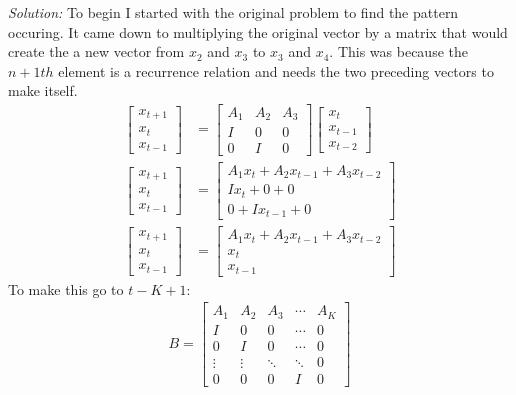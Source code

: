 \documentclass{article}
\newenvironment{solution}
    {\textit{Solution:}}
    {}
\begin{document}
\begin{solution}
To begin I started with the original problem to find the pattern occuring. It came down to multiplying the original vector by a matrix that would create the a new vector from $x_2$ and $x_3$ to $x_3$ and $x_4$. This was because the $n+1th$ element is a recurrence relation and needs the two preceding vectors to make itself.  
\begin{align*}
    \begin{bmatrix} x_{t+1} \\ x_t \\ x_{t-1}\end{bmatrix} &= \begin{bmatrix} A_1 & A_2 & A_3 \\ I & 0 & 0 \\ 0 & I & 0 \end{bmatrix} \begin{bmatrix} x_t \\ x_{t-1} \\ x_{t-2} \end{bmatrix} \\
    \begin{bmatrix} x_{t+1} \\ x_t \\ x_{t-1}\end{bmatrix} &= \begin{bmatrix} A_1x_t + A_2x_{t-1} + A_3x_{t-2} \\ Ix_t + 0 + 0 \\ 0 + Ix_{t-1} + 0 \end{bmatrix} \\ 
    \begin{bmatrix} x_{t+1} \\ x_t \\ x_{t-1}\end{bmatrix} &= \begin{bmatrix} A_1x_t + A_2x_{t-1} + A_3x_{t-2} \\ x_t  \\  x_{t-1} \end{bmatrix}
\end{align*}
To make this go to $t-K+1$:
\begin{align*}
    B = \begin{bmatrix} A_1 & A_2 & A_3 & \cdots & A_K \\ I & 0 & 0 & \cdots & 0 \\ 0 & I & 0 & \cdots & 0 \\ \vdots & \vdots & \ddots & \ddots & 0 \\ 0 & 0 & 0 & I & 0\end{bmatrix}
\end{align*}
\end{solution}
\end{document}
